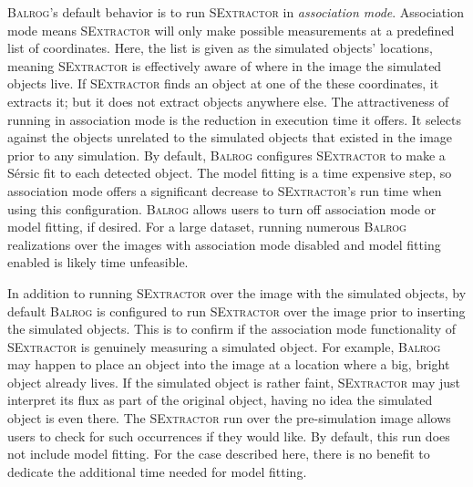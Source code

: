 \documentclass[11pt]{book}
\newcommand{\balrog}{\textsc{Balrog}}
\newcommand{\sex}{\textsc{SExtractor}}
\newcommand{\sersic}{S\'{e}rsic}
\begin{document}
\balrog{}'s default behavior is to run \sex{} in \emph{association mode}.
Association mode means \sex{} will only make possible measurements at a predefined list of coordinates.
Here, the list is given as the simulated objects' locations,
meaning \sex{} is effectively aware of where in the image the simulated objects live.
If \sex{} finds an object at one of the these coordinates, it extracts it; but it does not extract objects anywhere else.
The attractiveness of running in association mode is the reduction in execution time it offers.
It  selects against the objects unrelated to the simulated objects that existed in the image prior to any simulation.
By default, \balrog{} configures \sex{} to make a \sersic{} fit to each detected object.
The model fitting is a time expensive step, so association mode offers a significant decrease
to \sex{}'s run time  when using this configuration.
\balrog{} allows users to turn off association mode or model fitting, if desired.
For a large dataset, running numerous \balrog{} realizations over the images
with association mode disabled and model fitting enabled is likely time unfeasible.

In addition to running \sex{} over the image with the simulated objects,
by default \balrog{} is configured to run \sex{} over the image prior to inserting the simulated objects.
This is to confirm if the association mode functionality of \sex{} is genuinely measuring a simulated object.
For example, \balrog{} may happen to place an object into the image at a location where a big, bright object already lives.
If the simulated object is rather faint, \sex{} may just interpret its flux as part of the original object, having no
idea the simulated object is even there. The \sex{} run over the pre-simulation image allows users to check
for such occurrences if they would like. By default, this run does not include model fitting.
For the case described here, there is no benefit to dedicate the additional time needed for model fitting.
\end{document}
